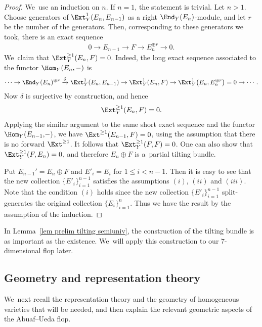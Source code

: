 \begin{proof}
We~use an induction on $n$.
If $n = 1$, the statement is trivial.
Let $n > 1$.
Choose generators of $\Ext_Y^{1}(E_n, E_{n-1})$ as a right $\End_Y(E_n)$-module, and let $r$ be the number of the generators.
Then, corresponding to these generators we took, there is an exact sequence
\begin{gather*}
0 \to E_{n-1} \to F \to E_n^{\oplus r} \to 0.
\end{gather*}
We~claim that $\Ext_Y^{\geq 1}(E_n, F) = 0$.
Indeed, the long exact sequence associated to the functor $\Hom_Y(E_n, -)$ is
\begin{gather*}
\cdots \to \End_Y(E_n)^{\oplus r} \xrightarrow{\delta} \Ext_Y^1(E_n, E_{n-1}) \to \Ext^1_Y(E_n, F) \to \Ext_Y^1\big(E_n, E_n^{\oplus r}\big) = 0 \to \cdots.
\end{gather*}
Now $\delta$ is surjective by construction, and hence
\begin{gather*}
\Ext_Y^{\geq 1}(E_n, F) = 0.
\end{gather*}
Applying the similar argument to the same short exact sequence and the functor $\Hom_Y(E_{n-1},\!{-})$,
we have $\Ext^{\geq 1}(E_{n-1}, F) = 0$, using the assumption that there is no forward $\Ext^{\geq 1}$.
It follows that $\Ext_Y^{\geq 1}(F, F) = 0$.
One can also show that $\Ext_Y^{\geq 1}(F, E_n) = 0$,
and therefore $E_n \oplus F$ is a~partial tilting bundle.


Put $E_{n-1}' = E_n \oplus F$ and $E'_i = E_i$ for $1 \leq i < n - 1$.
Then it is easy to see that the new collection $\{ E'_i \}_{i=1}^{n-1}$ satisfies the assumptions $(i)$, $(ii)$ and $(iii)$.
Note that the condition $(i)$ holds since the new collection $\{ E'_i \}_{i=1}^{n-1}$ split-generates the original collection $\{ E_i \}_{i=1}^{n}$.
Thus we have the result by the assumption of the induction.
\end{proof}

In Lemma~\ref{lem prelim tilting semiuniv}, the construction of the tilting bundle is as important as the existence.
We~will apply this construction to our $7$-dimensional flop later.


\subsection{Geometry and representation theory}

We~next recall the representation theory and the geometry of homogeneous varieties that will be needed,
and then explain the relevant geometric aspects of the Abuaf--Ueda flop.

